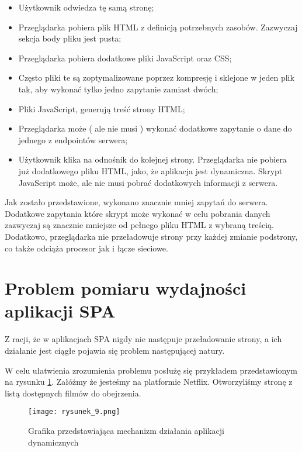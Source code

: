 \begin{itemize}
    \item Użytkownik odwiedza tę samą stronę;
    \item Przeglądarka pobiera plik HTML z definicją potrzebnych zasobów. Zazwyczaj sekcja body pliku jest pusta;
    \item Przeglądarka pobiera dodatkowe pliki JavaScript oraz CSS;
    \item Często pliki te są zoptymalizowane poprzez kompresję i sklejone w jeden plik tak, aby wykonać tylko jedno zapytanie zamiast dwóch;
    \item Pliki JavaScript, generują treść strony HTML;
    \item Przeglądarka może ( ale nie musi ) wykonać dodatkowe zapytanie o dane do jednego z endpointów serwera;
    \item Użytkownik klika na odnośnik do kolejnej strony. Przeglądarka nie pobiera już dodatkowego pliku HTML, jako, że aplikacja jest dynamiczna. Skrypt JavaScript może, ale nie musi pobrać dodatkowych informacji z serwera.
\end{itemize}

Jak zostało przedstawione, wykonano znacznie mniej zapytań do serwera. Dodatkowe zapytania które skrypt może wykonać w celu pobrania danych zazwyczaj są znacznie mniejsze od pełnego pliku HTML z wybraną treścią.
Dodatkowo, przeglądarka nie przeładowuje strony przy każdej zmianie podstrony, co także odciąża procesor jak i łącze sieciowe.

\section{Problem pomiaru wydajności aplikacji SPA}

Z racji, że w aplikacjach SPA nigdy nie następuje przeładowanie strony, a ich działanie jest ciągłe pojawia się problem następującej natury. 

W celu ułatwienia zrozumienia problemu posłużę się przykładem przedstawionym na rysunku \ref{fig:rysunek_9}. Załóżmy że jesteśmy na platformie Netflix. Otworzyliśmy stronę z listą dostępnych filmów do obejrzenia. 

\begin{figure}[htbp]
    \centering
    \advance\leftskip-2cm
    \texttt{[image: rysunek\_9.png]}
    \caption{Grafika przedstawiająca mechanizm działania aplikacji dynamicznych}
    \label{fig:rysunek_9}
\end{figure}

